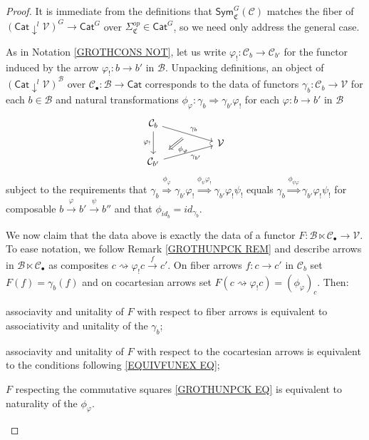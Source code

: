 \documentclass[a4paper,10pt
,draft
]{article}%
\numberwithin{equation}{section}
\numberwithin{figure}{section}
\theoremstyle{definition} %
\newcommand{\V}{\ensuremath{\mathcal V}}
\newcommand{\C}{\ensuremath{\mathcal C}}
\newcommand{\1}{\ensuremath{\mathbbm 1}}%
\begin{document}
\begin{proof}
It is immediate from the definitions that
$\mathsf{Sym}^G_{\mathfrak{C}}(\C)$
matches the fiber of 
$\left(\mathsf{Cat} \downarrow^l \V \right)^{G}
\to \mathsf{Cat}^{G}$
over $\Sigma_{\mathfrak{C}}^{op} \in \mathsf{Cat}^G$,
so we need only address the general case.

As in Notation \ref{GROTHCONS NOT},
let us write $\varphi_! \colon \mathcal{C}_b \to \mathcal{C}_{b'}$
for the functor induced by the arrow 
$\varphi_! \colon b \to b'$
in $\mathcal{B}$.
Unpacking definitions, an object of 
$\left(\mathsf{Cat} \downarrow^l \V \right)^{\mathcal{B}}$
over 
$\mathcal{C}_{\bullet} \colon \mathcal{B} \to \mathsf{Cat}$
corresponds to the data of functors
$\gamma_b \colon \mathcal{C}_b \to \mathcal{V}$ for each $b \in \mathcal{B}$
and natural transformations
$\phi_{\varphi} \colon \gamma_b \Rightarrow \gamma_{b'} \varphi_!$
for each $\varphi \colon b \to b'$ in $\mathcal{B}$
\begin{equation}\label{EQUIVFUNEX EQ}
\begin{tikzcd}[row sep = tiny, column sep = 50pt]
		\mathcal{C}_{b} \arrow{dr}[name=U]{\gamma_b} \arrow{dd}[swap]{\varphi_!}
	\\
		& \mathcal{V}
	\\
		|[alias=V]| \mathcal{C}_{b'} \arrow{ur}[swap]{\gamma_{b'}}
	\arrow[Leftarrow, from=V, to=U,shorten >=0.25cm,shorten <=0.25cm
	,swap,"\phi_{\varphi}"
	]
\end{tikzcd}
\end{equation}
subject to the requirements that
$\gamma_b \overset{\phi_{\varphi}}{\Rightarrow}
\gamma_{b'} \varphi_!
\overset{\phi_{\psi}\varphi_!}{\Rightarrow}
\gamma_{b'} \varphi_! \psi_!
$
equals 
$\gamma_b \overset{\phi_{\psi\varphi}}{\Rightarrow}
\gamma_{b'} \varphi_! \psi_!
$
for composable $b \xrightarrow{\varphi} b' \xrightarrow{\psi} b''$
and that
$\phi_{id_b} = id_{\gamma_b}$.

We now claim that the data above is exactly the data of a functor
$F \colon \mathcal{B} \ltimes \mathcal{C}_{\bullet} \to \mathcal{V}$.
To ease notation, we follow
Remark \ref{GROTHUNPCK REM}
and describe arrows in 
$\mathcal{B} \ltimes \mathcal{C}_{\bullet}$
as composites
$c \rightsquigarrow \varphi_! c \xrightarrow{f} c'$.
On fiber arrows 
$f\colon c \to c'$ in $\mathcal{C}_b$
set $F(f) = \gamma_b(f)$
and on cocartesian arrows set
$F(c \rightsquigarrow \varphi_! c) =
(\phi_{\varphi})_c$.
Then:
\begin{enumerate*}[label=(\roman*)]
\item
associavity and unitality of $F$ with respect to fiber arrows is equivalent to associativity and unitality of the $\gamma_b$;
\item associavity and unitality of $F$ with respect to the cocartesian arrows is equivalent to the conditions following 
\eqref{EQUIVFUNEX EQ};
\item $F$ respecting the commutative squares \eqref{GROTHUNPCK EQ}
is equivalent to naturality of the $\phi_{\varphi}$.
\end{enumerate*}


\end{proof}
\end{document}
